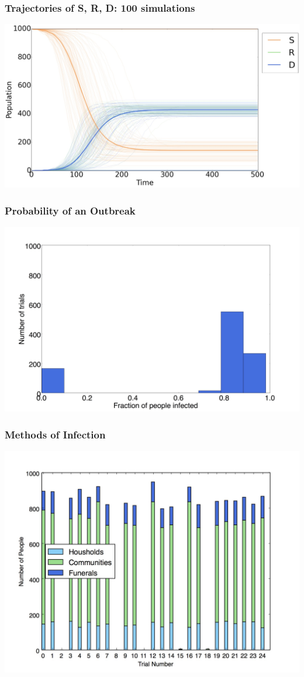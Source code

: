 \documentclass[30pt]{beamer}
\begin{document}
\begin{frame}
\frametitle{Trajectories of S, R, D: 100 simulations}
\includegraphics[width=\textwidth]{average-time-series}
\end{frame}

\begin{frame}
\frametitle{Probability of an Outbreak}
\includegraphics[width=\textwidth]{Histogram-sabd}
\end{frame}

\begin{frame}
\frametitle{Methods of Infection}
\centering
\includegraphics[width=.8\textwidth]{infecttypes}
\end{frame}
\end{document}
